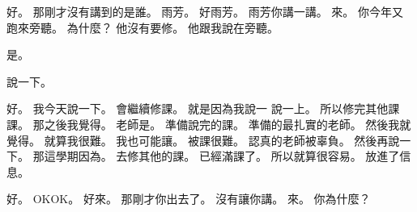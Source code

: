 \hypertarget{w01:cue:3470}{}好。
\hypertarget{w01:cue:3471}{}那剛才沒有講到的是誰。
\hypertarget{w01:cue:3472}{}雨芳。
\hypertarget{w01:cue:3473}{}好雨芳。
\hypertarget{w01:cue:3474}{}雨芳你講一講。
\hypertarget{w01:cue:3475}{}來。
\hypertarget{w01:cue:3476}{}你今年又跑來旁聽。
\hypertarget{w01:cue:3477}{}為什麼？
\hypertarget{w01:cue:3478}{}他沒有要修。
\hypertarget{w01:cue:3479}{}他跟我說在旁聽。

\hypertarget{w01:cue:3480}{}是。

\hypertarget{w01:cue:3481}{}說一下。

\hypertarget{w01:cue:3482}{}好。
\hypertarget{w01:cue:3483}{}我今天說一下。
\hypertarget{w01:cue:3484}{}會繼續修課。
\hypertarget{w01:cue:3485}{}就是因為我說一
\hypertarget{w01:cue:3486}{}說一上。
\hypertarget{w01:cue:3487}{}所以修完其他課課。
\hypertarget{w01:cue:3488}{}那之後我覺得。
\hypertarget{w01:cue:3489}{}老師是。
\hypertarget{w01:cue:3490}{}準備說完的課。
\hypertarget{w01:cue:3491}{}準備的最扎實的老師。
\hypertarget{w01:cue:3492}{}然後我就覺得。
\hypertarget{w01:cue:3493}{}就算我很難。
\hypertarget{w01:cue:3494}{}我也可能讓。
\hypertarget{w01:cue:3495}{}被課很難。
\hypertarget{w01:cue:3496}{}認真的老師被辜負。
\hypertarget{w01:cue:3497}{}然後再說一下。
\hypertarget{w01:cue:3498}{}那這學期因為。
\hypertarget{w01:cue:3499}{}去修其他的課。
\hypertarget{w01:cue:3500}{}已經滿課了。
\hypertarget{w01:cue:3501}{}所以就算很容易。
\hypertarget{w01:cue:3502}{}放進了信息。

\hypertarget{w01:cue:3503}{}好。
\hypertarget{w01:cue:3504}{}OKOK。
\hypertarget{w01:cue:3505}{}好來。
\hypertarget{w01:cue:3506}{}那剛才你出去了。
\hypertarget{w01:cue:3507}{}沒有讓你講。
\hypertarget{w01:cue:3508}{}來。
\hypertarget{w01:cue:3509}{}你為什麼？

